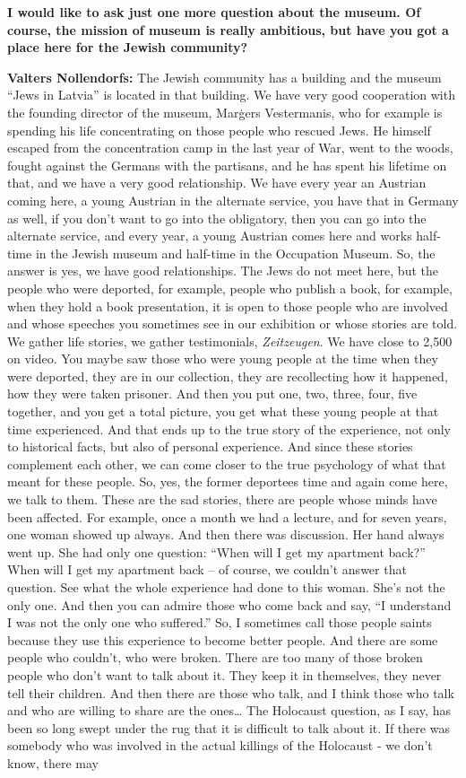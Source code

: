 \textbf{I would like to ask just one more question about the museum. Of course, the mission of museum is really ambitious, but have you got a place here for the Jewish community?}

\textbf{Valters Nollendorfs:} The Jewish community has a building and the museum ``Jews in Latvia'' is located in that building. We have very good cooperation with the founding director of the museum, Marģers Vestermanis, who for example is spending his life concentrating on those people who rescued Jews. He himself escaped from the concentration camp in the last year of War, went to the woods, fought against the Germans with the partisans, and he has spent his lifetime on that, and we have a very good relationship. We have every year an Austrian coming here, a young Austrian in the alternate service, you have that in Germany as well, if you don't want to go into the obligatory, then you can go into the alternate service, and every year, a young Austrian comes here and works half-time in the Jewish museum and half-time in the Occupation Museum. So, the answer is yes, we have good relationships. The Jews do not meet here, but the people who were deported, for example, people who publish a book, for example, when they hold a book presentation, it is open to those people who are involved and whose speeches you sometimes see in our exhibition or whose stories are told. We gather life stories, we gather testimonials, \textit{Zeitzeugen}. We have close to 2,500 on video. You maybe saw those who were young people at the time when they were deported, they are in our collection, they are recollecting how it happened, how they were taken prisoner. And then you put one, two, three, four, five together, and you get a total picture, you get what these young people at that time experienced. And that ends up to the true story of the experience, not only to historical facts, but also of personal experience. And since these stories complement each other, we can come closer to the true psychology of what that meant for these people. So, yes, the former deportees time and again come here, we talk to them. These are the sad stories, there are people whose minds have been affected. For example, once a month we had a lecture, and for seven years, one woman showed up always. And then there was discussion. Her hand always went up. She had only one question: ``When will I get my apartment back?'' When will I get my apartment back – of course, we couldn’t answer that question. See what the whole experience had done to this woman. She’s not the only one. And then you can admire those who come back and say, ``I understand I was not the only one who suffered.'' So, I sometimes call those people saints because they use this experience to become better people. And there are some people who couldn’t, who were broken. There are too many of those broken people who don’t want to talk about it. They keep it in themselves, they never tell their children. And then there are those who talk, and I think those who talk and who are willing to share are the ones… The Holocaust question, as I say, has been so long swept under the rug that it is difficult to talk about it. If there was somebody who was involved in the actual killings of the Holocaust - we don’t know, there may 